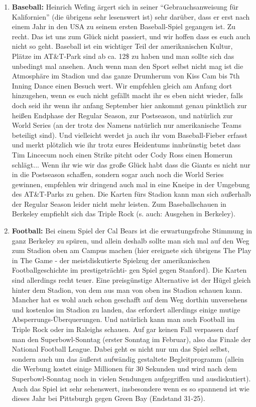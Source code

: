 \documentclass[a4paper]{scrreprt}
\begin{document}
\begin{enumerate}

	\item \textbf{Baseball:} Heinrich Wefing ärgert sich in seiner "`Gebrauchsanweisung für Kalifornien"' (die übrigens sehr lesenswert ist) sehr darüber, dass er erst nach einem Jahr in den USA zu seinem ersten Baseball-Spiel gegangen ist. Zu recht. Das ist uns zum Glück nicht passiert, und wir hoffen dass es euch auch nicht so geht. Baseball ist ein wichtiger Teil der amerikanischen Kultur, Plätze im AT\&T-Park sind ab ca. 12\$ zu haben und man sollte sich das unbedingt mal ansehen. Auch wenn man den Sport selbst nicht mag ist die Atmosphäre im Stadion und das ganze Drumherum von Kiss Cam bis 7th Inning Dance einen Besuch wert. Wir empfehlen gleich am Anfang dort hinzugehen, wenn es euch nicht gefällt macht ihr es eben nicht wieder, falls doch seid ihr wenn ihr anfang September hier ankommt genau pünktlich zur heißen Endphase der Regular Season, zur Postseason, und natürlich zur World Series (an der trotz des Namens natürlich nur amerikanische Teams beteiligt sind). Und vielleicht werdet ja auch ihr vom Baseball-Fieber erfasst und merkt plötzlich wie ihr trotz eures Heidentums innbrünstig betet dass Tim Lincecum noch einen Strike pitcht oder Cody Ross einen Homerun schlägt... Wenn ihr wie wir das große Glück habt dass die Giants es nicht nur in die Postseason schaffen, sondern sogar auch noch die World Series gewinnen, empfehlen wir dringend auch mal in eine Kneipe in der Umgebung des AT\&T-Parks zu gehen. Die Karten fürs Stadion kann man sich außerhalb der Regular Season leider nicht mehr leisten. Zum Baseballschauen in Berkeley empfiehlt sich das Triple Rock (s. auch: Ausgehen in Berkeley).

	\item \textbf{Football:} Bei einem Spiel der Cal Bears ist die erwartungsfrohe Stimmung in ganz Berkeley zu spüren, und allein deshalb sollte man sich mal auf den Weg zum Stadion oben am Campus machen (hier ereignete sich übrigens The Play in The Game - der meistdiskutierte Spielzug der amerikanischen Footballgeschichte im prestigeträchti- gen Spiel gegen Stanford). Die Karten sind allerdings recht teuer. Eine preisgünstige Alternative ist der Hügel gleich hinter dem Stadion, von dem aus man von oben ins Stadion schauen kann. Mancher hat es wohl auch schon geschafft auf dem Weg dorthin unversehens und kostenlos im Stadion zu landen, das erfordert allerdings einige mutige Absperrungs-Überquerungen. Und natürlich kann man auch Football im Triple Rock oder im Raleighs schauen. Auf gar keinen Fall verpassen darf man den Superbowl-Sonntag (erster Sonntag im Februar), also das Finale der National Football League. Dabei geht es nicht nur um das Spiel selbst, sondern auch um das äußerst aufwändig gestaltete Begleitprogramm (allein die Werbung kostet einige Millionen für 30 Sekunden und wird nach dem Superbowl-Sonntag noch in vielen Sendungen aufgegriffen und ausdiskutiert). Auch das Spiel ist sehr sehenswert, insbesondere wenn es so spannend ist wie dieses Jahr bei Pittsburgh gegen Green Bay (Endstand 31-25).
	

\end{enumerate}
\end{document}
